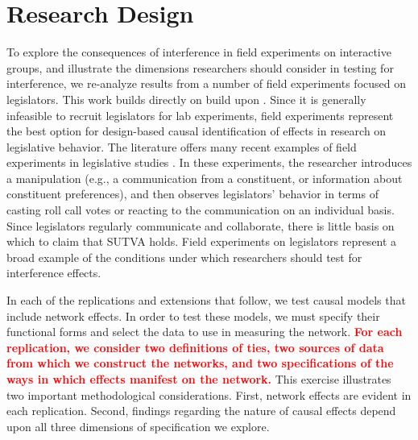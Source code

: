 \documentclass[12pt]{article}
\begin{document}
\section{Research Design}

To explore the consequences of interference in field experiments on interactive groups, and illustrate the dimensions researchers should consider in testing for interference, we re-analyze results from a number of field experiments focused on legislators. This work builds directly on build upon \citet{coppock2014information}. Since it is generally infeasible to recruit legislators for lab experiments, field experiments represent the best option for design-based causal identification of effects in research on legislative behavior. The literature offers many recent examples of field experiments in legislative studies \citep[e.g., ][]{bergan2009does,butler2011politicians,butler2012field,broockman2013black,nyhan2015effect,bergan2015call}. In these experiments, the researcher introduces a manipulation (e.g., a communication from a constituent, or information about constituent preferences), and then observes legislators' behavior in terms of casting roll call votes or reacting to the communication on an individual basis. Since legislators regularly communicate and collaborate, there is little basis on which to claim that SUTVA holds. Field experiments on legislators represent a broad example of the conditions under which researchers should test for interference effects.

In each of the replications and extensions that follow, we test causal models that include network effects. In order to test these models, we must specify their functional forms and select the data to use in measuring the network. \textbf{\textcolor{red}{For each replication, we consider two definitions of ties, two sources of data from which we construct the networks, and two specifications of the ways in which effects manifest on the network.}} This exercise illustrates two important methodological considerations. First, network effects are evident in each replication. Second, findings regarding the nature of causal effects depend upon all three dimensions of specification we explore.



\subsection{\citet{butler2011can}}
\end{document}
